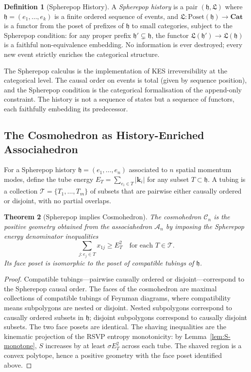 \documentclass[12pt, oneside]{amsart}
\theoremstyle{plain}
\newtheorem{theorem}{Theorem}[section]
\theoremstyle{definition}
\newtheorem{definition}[theorem]{Definition}
\theoremstyle{remark}
\newcommand{\Sf}{S}
\newcommand{\hist}{\mathfrak{h}}
\newcommand{\Log}{\mathfrak{L}}
\newcommand{\Assoc}{\mathcal{A}_n}
\newcommand{\Cosmo}{\mathcal{C}_n}
\begin{document}
\begin{definition}[Spherepop History]
A \emph{Spherepop history} is a pair $(\hist, \Log)$ where $\hist = (e_1, \ldots, e_k)$ is a finite ordered sequence of events, and $\Log: \mathrm{Poset}(\hist) \to \mathbf{Cat}$ is a functor from the poset of prefixes of $\hist$ to small categories, subject to the Spherepop condition: for any proper prefix $\hist' \subsetneq \hist$, the functor $\Log(\hist') \to \Log(\hist)$ is a faithful non-equivalence embedding. No information is ever destroyed; every new event strictly enriches the categorical structure.
\end{definition}

The Spherepop calculus is the implementation of KES irreversibility at the categorical level. The causal order on events is total (given by sequence position), and the Spherepop condition is the categorical formalisation of the append-only constraint. The history is not a sequence of states but a sequence of functors, each faithfully embedding its predecessor.

\subsection{The Cosmohedron as History-Enriched Associahedron}

For a Spherepop history $\hist = (e_1, \ldots, e_n)$ associated to $n$ spatial momentum modes, define the tube energy $E_T = \sum_{e_i \in T} |\mathbf{k}_i|$ for any subset $T \subset \hist$. A tubing is a collection $\mathcal{T} = \{T_1, \ldots, T_m\}$ of subsets that are pairwise either causally ordered or disjoint, with no partial overlaps.

\begin{theorem}[Spherepop implies Cosmohedron]
\label{thm:cosmo}
The cosmohedron $\Cosmo$ is the positive geometry obtained from the associahedron $\Assoc$ by imposing the Spherepop energy denominator inequalities
\[
  \sum_{j: e_j \in T} x_{1j} \geq E_T^2 \quad \text{for each } T \in \mathcal{T}.
\]
Its face poset is isomorphic to the poset of compatible tubings of $\hist$.
\end{theorem}

\begin{proof}
Compatible tubings---pairwise causally ordered or disjoint---correspond to the Spherepop causal order. The faces of the cosmohedron are maximal collections of compatible tubings of Feynman diagrams, where compatibility means subpolygons are nested or disjoint. Nested subpolygons correspond to causally ordered subsets in $\hist$; disjoint subpolygons correspond to causally disjoint subsets. The two face posets are identical. The shaving inequalities are the kinematic projection of the RSVP entropy monotonicity: by Lemma~\ref{lem:S-monotone}, $\Sf$ increases by at least $\sigma E_T^2$ across each tube. The shaved region is a convex polytope, hence a positive geometry with the face poset identified above.
\end{proof}
\end{document}
